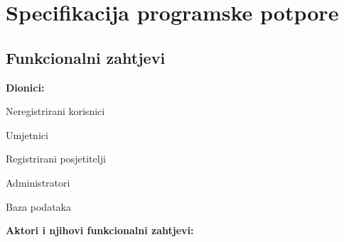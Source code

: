 \chapter{Specifikacija programske potpore}
		
	\section{Funkcionalni zahtjevi}
			
			\noindent \textbf{Dionici:}
			
			\begin{packed_enum}
				
				\item Neregistrirani korisnici
				\item Umjetnici				
				\item Registrirani posjetitelji
				\item Administratori
				\item Baza podataka
				
			\end{packed_enum}
			
			\noindent \textbf{Aktori i njihovi funkcionalni zahtjevi:}
			
